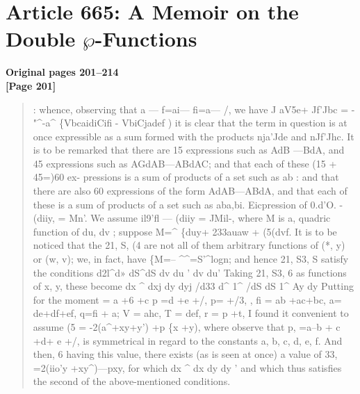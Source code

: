 \documentclass[11pt,a4paper]{book}
\begin{document}
\newpage

\section*{Article 665: A Memoir on the Double $\wp$-Functions}
\textbf{Original pages 201--214}\\[0.3cm]

\textbf{[Page 201]}\\[0.2cm]
\begin{quote}
:
whence, observing that a --- f=ai--- fi=a--- /, we have
J aV5e+ Jf'Jbc = - "\textasciicircum{}-a\textasciicircum{} \{VbcaidiCifi - VbiCjadef )
it is clear that the term in question is at once expressible as a sum formed with
the products nja'Jde and nJf'Jhc.
It is to be remarked that there are 15 expressions such as AdB ---BdA, and
45 expressions such as AGdAB---ABdAC; and that each of these (15 + 45=)60 ex-
pressions is a sum of products of a set such as ab : and that there are also 60
expressions of the form AdAB---ABdA, and that each of these is a sum of products
of a set such as aba,bi.
Eicpression of 0.d'O. - (diiy, = Mn'.
We assume il9'fl --- (diiy = JMil-, where M is a, quadric function of du, dv ; suppose
M=\textasciicircum{}
\{duy+ 233auaw + (5(dvf.
It is to be noticed that the 21, S, (4 are not all of them arbitrary functions of (*, y)
or (w, v); we, in fact, have \{M=-- \textasciicircum{}\textasciicircum{}=S'\textasciicircum{}logn; and hence 21, S3, S satisfy the
conditions
d2l\textasciicircum{}d» dS\textasciicircum{}dS
dv du ' dv du'
Taking 21, S3, 6 as functions of x, y, these become
dx \textasciicircum{} dxj dy dyj
/d33 d\textasciicircum{} 1\textasciicircum{} /dS dS 1\textasciicircum{}
Ay dy
Putting for the moment
 = a +6 +c p =d +e +/, p= +/3,
,
fi = ab +ac+bc, a= de+df+ef, q=fi + a;
V = ahc, T = def, r = p +t,
I found it convenient to assume
(5 = -2(a\textasciicircum{}+xy+y') +p \{x +y),
where observe that p, =a--b + c +d+ e +/, is symmetrical in regard to the constants
a, b, c, d, e, f. And then, 6 having this value, there exists (as is seen at once) a
value of 33, =2(iio'y +xy\textasciicircum{})---pxy, for which
dx \textasciicircum{} dx dy dy
'
and which thus satisfies the second of the above-mentioned conditions.
\end{quote}
\end{document}
